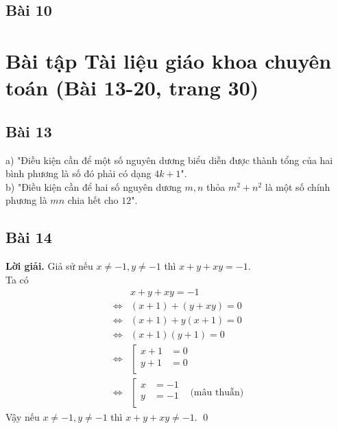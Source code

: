 \documentclass[a4paper,14pt]{article}
\begin{document}
    \subsection{Bài 10}

\section{Bài tập Tài liệu giáo khoa chuyên toán (Bài 13-20, trang 30)}
    \subsection{Bài 13}
        a) "Điều kiện cần để một số nguyên dương biểu diễn được thành tổng của hai bình phương là số đó phải có dạng $4k+1$". \\
        b) "Điều kiện cần để hai số nguyên dương $m,n$ thỏa $m^2+n^2$ là một số chính phương là $mn$ chia hết cho $12$".
    
    \subsection{Bài 14}
        \textbf{Lời giải.} 
            Giả sử nếu $x\neq -1, y\neq -1$ thì $x+y+xy=-1$. \\
            Ta có
                \begin{align*}
                    &x+y+xy=-1
                    \\ \Leftrightarrow& (x+1)+(y+xy)=0
                    \\ \Leftrightarrow& (x+1)+y(x+1)=0
                    \\ \Leftrightarrow& (x+1)(y+1)=0
                    \\ \Leftrightarrow& 
                                            \left[
                                                \begin{matrix}
                                                    x+1&=0 &\\
                                                    y+1&=0 &\\
                                                \end{matrix}
                                            \right.\\
                    \Leftrightarrow& 
                                            \left[
                                                \begin{matrix}
                                                    x&=-1 &\\
                                                    y&=-1 &\\
                                                \end{matrix}
                                            \right.
                    \text{(mâu thuẫn)}
                \end{align*}
            Vậy nếu $x\neq -1, y\neq -1$ thì $x+y+xy\neq -1$.
        \qed
\end{document}
